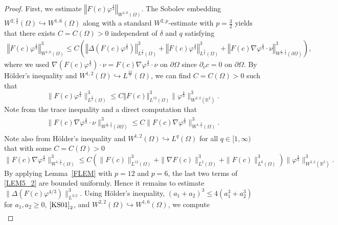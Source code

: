 \documentclass[10pt,a4paper]{amsart}
\newcommand{\R}{{ \mathbb{R}  }}
\newcommand{\bke}[1]{\left( #1 \right)}
\newcommand{\norm}[1]{\left\Vert #1 \right\Vert}
\begin{document}
\begin{proof}
First, we estimate $\norm{   F(c)  \varphi^{\frac{4}{3}}}_{W^{1,6}(\Omega)}$.
The Sobolev embedding $W^{2,\frac{3}{2}}(\Omega)\hookrightarrow W^{1,6}(\Omega)$ along with 
a standard $W^{2,p}$-estimate with $p=\frac{3}{2}$
yields that there exists $C=C(\Omega)>0$ independent of $\delta$ and $q$ satisfying
\begin{equation}\label{LEM5_2}
\begin{aligned}
 \norm{   F(c)  \varphi^{\frac{4}{3}}}_{W^{1,6}(\Omega)}^{3}
 \le C\bke{  \norm{\Delta \bke{  F(c)   \varphi^{\frac{4}{3}} } }_{L^{\frac{3}{2}}(\Omega)}^{3} +\norm{    F(c)   \varphi^{\frac{4}{3}}}_{L^{\frac{3}{2}}(\Omega)}^{3} +\norm{ F(c)\nabla \varphi^{\frac{4}{3}} \cdot \nu }_{W^{\frac{1}{3},\frac{3}{2}}(\partial\Omega)}^{3} },
\end{aligned}
\end{equation}
where we used
$\nabla(F(c)\varphi^{\frac{4}{3}})\cdot\nu=F(c)\nabla \varphi^{\frac{4}{3}} \cdot \nu$ on $\partial\Omega$ since $\partial_{\nu} c = 0$ on $\partial \Omega$. 
By H\"older's inequality and   $W^{1,2}(\Omega)\hookrightarrow L^{\frac{12}{7}}(\Omega)$, we can find $C=C(\Omega)>0$ such that
\[
\| F(c)   \varphi^{\frac{4}{3}}\|_{L^{\frac{3}{2}}(\Omega)}^{3}\le C \norm{ F(c)}_{L^{12}(\Omega)}^{3}\|\varphi^{\frac{4}{3}}\|_{W^{2,2}(\R^{2})}^{3}.
\]
Note   from the trace inequality and a direct computation that
\begin{align*}
\begin{aligned}
\| F(c)\nabla \varphi^{\frac{4}{3}} \cdot \nu \|_{W^{\frac{1}{3},\frac{3}{2}}(\partial\Omega)}^{3}\le C \|F(c)\nabla \varphi^{\frac{4}{3}} \|_{W^{1,\frac{3}{2}}( \Omega)}^{3}.
\end{aligned}
\end{align*}
Note also from H\"older's inequality and $W^{1,2}(\Omega)\hookrightarrow L^{q}(\Omega)$ for all $q\in[1,\infty)$ that with some $C=C(\Omega)>0$
\[
\|F(c)\nabla \varphi^{\frac{4}{3}} \|_{W^{1,\frac{3}{2}}( \Omega)}^{3}\le C(\|F(c)\|_{L^{12}(\Omega)}^{3}+\|\nabla F(c)\|_{L^{2}(\Omega)}^{3}+ \|F(c)\|_{L^{6}(\Omega)}^{3})\|\varphi^{\frac{4}{3}}\|_{W^{2,2}(\R^{2})}^{3}.
\]
By applying Lemma~\ref{FLEM} with $p=12$ and $p=6$, the last two terms of \eqref{LEM5_2} are bounded uniformly. 
Hence it remains to estimate $\|\Delta(F(c)\varphi^{4/3})\|_{L^{3/2}}^{3}$.
Using  H\"older's inequality,  $(a_{1}+a_{2})^{3}\le 4(a_{1}^{3}+a_{2}^{3})$ for $a_{1},a_{2}\ge0$,  $\eqref{KS01}_{2}$, and $W^{2,2}(\Omega)\hookrightarrow W^{1,6}(\Omega)$, we compute 
\begin{align*}

\end{align*}
\end{proof}
\end{document}
